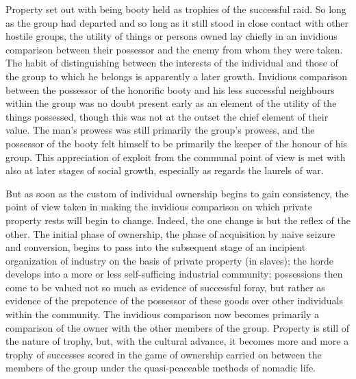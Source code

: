 \documentclass[12pt]{report}
\begin{document}
Property set out with being booty held as trophies of the successful
raid. So long as the group had departed and so long as it still stood
in close contact with other hostile groups, the utility of things or
persons owned lay chiefly in an invidious comparison between their
possessor and the enemy from whom they were taken. The habit of
distinguishing between the interests of the individual and those of
the group to which he belongs is apparently a later growth. Invidious
comparison between the possessor of the honorific booty and his less
successful neighbours within the group was no doubt present early as an
element of the utility of the things possessed, though this was not at
the outset the chief element of their value. The man's prowess was
still primarily the group's prowess, and the possessor of the booty
felt himself to be primarily the keeper of the honour of his group. This
appreciation of exploit from the communal point of view is met with also
at later stages of social growth, especially as regards the laurels of
war.

But as soon as the custom of individual ownership begins to gain
consistency, the point of view taken in making the invidious comparison
on which private property rests will begin to change. Indeed, the one
change is but the reflex of the other. The initial phase of ownership,
the phase of acquisition by naive seizure and conversion, begins to pass
into the subsequent stage of an incipient organization of industry on
the basis of private property (in slaves); the horde develops into a
more or less self-sufficing industrial community; possessions then come
to be valued not so much as evidence of successful foray, but rather as
evidence of the prepotence of the possessor of these goods over other
individuals within the community. The invidious comparison now becomes
primarily a comparison of the owner with the other members of the
group. Property is still of the nature of trophy, but, with the cultural
advance, it becomes more and more a trophy of successes scored in the
game of ownership carried on between the members of the group under the
quasi-peaceable methods of nomadic life.
\end{document}
